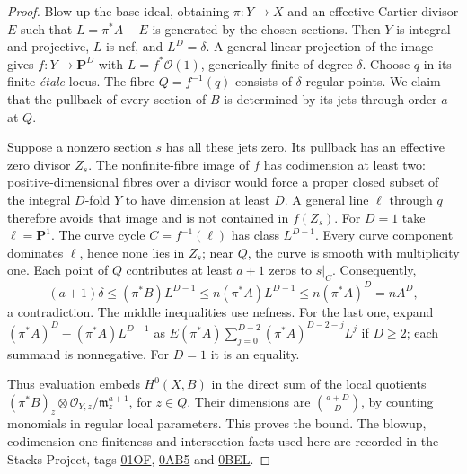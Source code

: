 \begin{proof}
Blow up the base ideal, obtaining $\pi:Y\to X$ and an effective
Cartier divisor $E$ such that $L=\pi^*A-E$ is generated by the chosen
sections. Then $Y$ is integral and projective, $L$ is nef, and
$L^D=\delta$. A general linear projection of the image gives
$f:Y\to\mathbf P^D$ with $L=f^*\mathcal O(1)$, generically finite
of degree $\delta$. Choose $q$ in its finite \emph{\'etale} locus.
The fibre $Q=f^{-1}(q)$ consists of $\delta$ regular points. We claim
that the pullback of every section of $B$ is determined by its jets
through order $a$ at $Q$.

Suppose a nonzero section $s$ has all these jets zero. Its pullback
has an effective zero divisor $Z_s$. The nonfinite-fibre image of
$f$ has codimension at least two: positive-dimensional fibres over
a divisor would force a proper closed subset of the integral
$D$-fold $Y$ to have dimension at least $D$. A general line $\ell$
through $q$ therefore avoids that image and is not contained in
$f(Z_s)$. For $D=1$ take $\ell=\mathbf P^1$. The curve cycle
$C=f^{-1}(\ell)$ has class $L^{D-1}$. Every curve component dominates
$\ell$, hence none lies in $Z_s$; near $Q$, the curve is smooth
with multiplicity one. Each point of $Q$ contributes at least
$a+1$ zeros to $s|_C$. Consequently,
\[
 (a+1)\delta\le(\pi^*B)L^{D-1}
       \le n(\pi^*A)L^{D-1}\le n(\pi^*A)^D=nA^D,
\]
a contradiction. The middle inequalities use nefness. For the
last one, expand $(\pi^*A)^D-(\pi^*A)L^{D-1}$ as
$E(\pi^*A)\sum_{j=0}^{D-2}(\pi^*A)^{D-2-j}L^j$ if $D\ge2$;
each summand is nonnegative. For $D=1$ it is an equality.

Thus evaluation embeds $H^0(X,B)$ in the direct sum of the local
quotients $(\pi^*B)_z\otimes\mathcal O_{Y,z}/\mathfrak m_z^{a+1}$,
for $z\in Q$. Their dimensions are $\binom{a+D}{D}$, by counting
monomials in regular local parameters. This proves the bound.
The blowup, codimension-one finiteness and intersection facts used
here are recorded in the Stacks Project, tags
\href{https://stacks.math.columbia.edu/tag/01OF}{01OF},
\href{https://stacks.math.columbia.edu/tag/0AB5}{0AB5} and
\href{https://stacks.math.columbia.edu/tag/0BEL}{0BEL}.
\end{proof}

